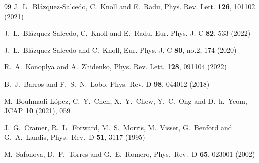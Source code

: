 \documentclass[a4paper,12pt]{article}
\begin{document}
\begin{thebibliography}{99}
J.~L.~Bl\'azquez-Salcedo, C.~Knoll and E.~Radu,
Phys. Rev. Lett. \textbf{126}, 101102 (2021)

J.~L.~Bl\'azquez-Salcedo, C.~Knoll and E.~Radu,
Eur. Phys. J. C \textbf{82}, 533 (2022)

J.~L.~Bl\'azquez-Salcedo and C.~Knoll,
Eur. Phys. J. C \textbf{80}, no.2, 174 (2020)

R.~A.~Konoplya and A.~Zhidenko,
Phys. Rev. Lett. \textbf{128}, 091104 (2022)

B.~J.~Barros and F.~S.~N.~Lobo,
Phys. Rev. D \textbf{98}, 044012 (2018)

M.~Bouhmadi-L\'opez, C.~Y.~Chen, X.~Y.~Chew, Y.~C.~Ong and D.~h.~Yeom,
JCAP \textbf{10} (2021), 059

  J.~G.~Cramer, R.~L.~Forward, M.~S.~Morris, M.~Visser, G.~Benford and G.~A.~Landis,
  Phys.\ Rev.\ D {\bf 51}, 3117 (1995)

  M.~Safonova, D.~F.~Torres and G.~E.~Romero,
  Phys.\ Rev.\ D {\bf 65}, 023001 (2002)


\end{thebibliography}
\end{document}
